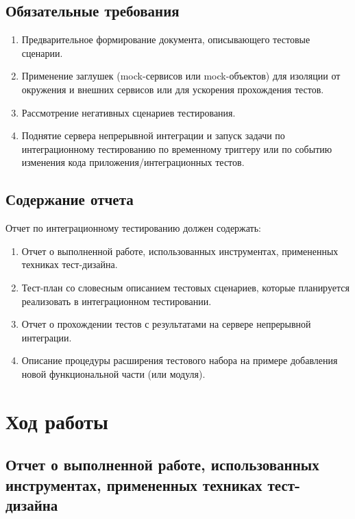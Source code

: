\documentclass[a4paper, 14pt]{article}
\begin{document}
\subsection{Обязательные требования}

\begin{enumerate}
    \item Предварительное формирование документа, описывающего тестовые сценарии.
    \item Применение заглушек (mock-сервисов или mock-объектов) для изоляции от окружения и внешних сервисов или для ускорения прохождения тестов.
    \item Рассмотрение негативных сценариев тестирования.
    \item Поднятие сервера непрерывной интеграции и запуск задачи по интеграционному тестированию по временному триггеру или по событию изменения кода приложения/интеграционных тестов.
\end{enumerate}

\subsection{Содержание отчета}

Отчет по интеграционному тестированию должен содержать:

\begin{enumerate}
    \item Отчет о выполненной работе, использованных инструментах, примененных техниках тест-дизайна.
    \item Тест-план со словесным описанием тестовых сценариев, которые планируется реализовать в интеграционном тестировании.
    \item Отчет о прохождении тестов с результатами на сервере непрерывной интеграции.
    \item Описание процедуры расширения тестового набора на примере добавления новой функциональной части (или модуля).
\end{enumerate}

\section{Ход работы}

\subsection{Отчет о выполненной работе, использованных инструментах, примененных техниках тест-дизайна}
\end{document}
